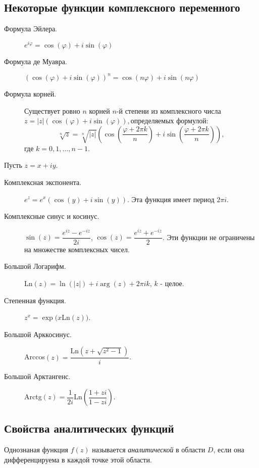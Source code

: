 \documentclass[a4paper,12pt]{scrartcl}
\begin{document}
\subsection{Некоторые функции комплексного переменного}
\begin{description}
\item[Формула Эйлера.] $e^{i\varphi} = \cos(\varphi) + i\sin(\varphi)$
\item[Формула де Муавра.] $(\cos(\varphi) + i\sin(\varphi))^n = \cos(n\varphi) + i\sin(n\varphi)$
\item[Формула корней.] Существует ровно $n$ корней $n$-й степени из комплексного числа $z = |z|(\cos(\varphi) + i\sin(\varphi)),$определяемых формулой: $$\sqrt[n]{z} = \sqrt[n]{|z|}\left(\cos\left(\dfrac{\varphi + 2\pi k}{n}\right)+ i\sin\left(\dfrac{\varphi + 2\pi k}{n}\right)\right),$$ где $k = 0,1,\ldots,n-1$.
\end{description}
Пусть $z= x+ iy.$
\begin{description}
\item[Комплексная экспонента.] $e^z = e^x(\cos(y) + i\sin(y))$. Эта функция имеет период $2\pi i$.
\item[Комплексные синус и косинус.] $\sin(z)= \dfrac{e^{iz}-e^{-iz}}{2i}$, $\cos(z)= \dfrac{e^{iz}+e^{-iz}}{2}$. Эти функции не ограничены на множестве комплексных чисел.
\item[Большой Логарифм.] Ln$(z) = \ln(|z|) + i\arg(z) + 2\pi i k$, $k$ - целое.
\item[Степенная функция.] $z^x = \exp(x$Ln$(z))$.
\item[Большой Арккосинус.] Arccos$(z) = \dfrac{\text{Ln}(z + \sqrt{z^2-1})}{i}$.
\item[Большой Арктангенс.] Arctg$(z) =\dfrac{1}{2i}$Ln$\left(\dfrac{1+zi}{1-zi}\right)$.
\end{description}
\subsection{Свойства аналитических функций}
Однознаная функция $f(z)$ называется \emph{аналитической} в области $D$, если она дифференцируема в каждой точке этой области.
\end{document}
